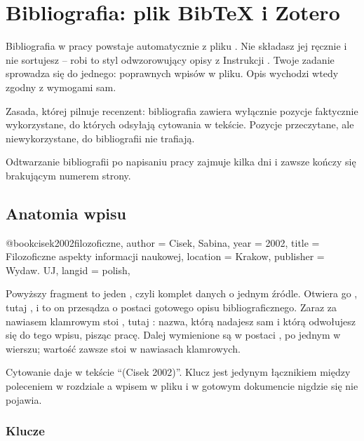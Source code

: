 \chapter{Bibliografia: plik BibTeX i Zotero}\label{ch:bibliografia}

Bibliografia w pracy powstaje automatycznie z pliku . Nie składasz jej ręcznie i nie sortujesz -- robi to styl odwzorowujący opisy z Instrukcji \parencite{instrukcjaISI}. Twoje zadanie sprowadza się do jednego: poprawnych wpisów w pliku. Opis wychodzi wtedy zgodny z wymogami sam.

Zasada, której pilnuje recenzent: bibliografia zawiera wyłącznie pozycje faktycznie wykorzystane, do których odsyłają cytowania w tekście. Pozycje przeczytane, ale niewykorzystane, do bibliografii nie trafiają.

 Odtwarzanie bibliografii po napisaniu pracy zajmuje kilka dni i zawsze kończy się brakującym numerem strony.

\section{Anatomia wpisu}

\begin{zapis}
@book{cisek2002filozoficzne,
  author    = {Cisek, Sabina},
  year      = {2002},
  title     = {Filozoficzne aspekty informacji naukowej},
  location  = {Krakow},
  publisher = {Wydaw. UJ},
  langid    = {polish},
}
\end{zapis}

Powyższy fragment to jeden , czyli komplet danych o jednym źródle. Otwiera go , tutaj , i to on przesądza o postaci gotowego opisu bibliograficznego. Zaraz za nawiasem klamrowym stoi , tutaj : nazwa, którą nadajesz sam i którą odwołujesz się do tego wpisu, pisząc pracę. Dalej wymienione są  w postaci , po jednym w wierszu; wartość zawsze stoi w nawiasach klamrowych.

Cytowanie  daje w tekście \enquote{(Cisek 2002)}. Klucz jest jedynym łącznikiem między poleceniem w rozdziale a wpisem w pliku i w gotowym dokumencie nigdzie się nie pojawia.

\subsection{Klucze}

